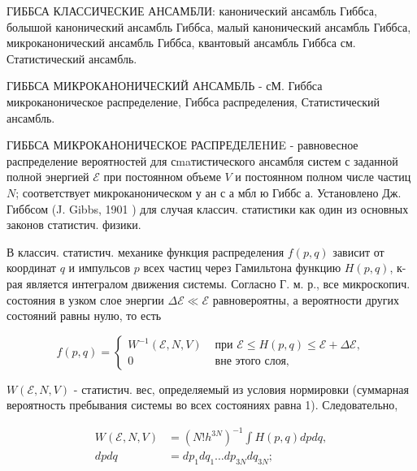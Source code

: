 \documentclass[10pt]{article}
\begin{document}
ГИББСА КЛАССИЧЕСКИЕ АНСАМБЛИ: канонический ансамбль Гиббса, болышой канонический ансамбль Гиббса, малый канонический ансамбль Гиббса, микроканонический ансамбль Гиббса, квантовый ансамбль Гиббса см. Статистический ансамбль.



ГИББСА МИКРОКАНОНИЧЕСКИЙ АНСАМБЛЬ - сМ. Гиббса микроканоническое распределение, Гиббса распределения, Статистический ансамбль.



ГИББСА МИКРОКАНОНИЧЕСКОЕ РАСПРЕДЕЛЕHИE - равновесное распределение вероятностей для сmaтистического ансамбля систем с заданной полной энергией $\mathscr{E}$ при постоянном объеме $V$ и постоянном полном числе частиц $N$; соответствует микроканоническом у ан с а мбл ю Гиббс а. Установлено Дж. Гиббсом (J. Gibbs, 1901 ) для случая классич. статистики как один из основных законов статистич. физики.



В классич. статистич. механике функция распределения $f(p, q)$ зависит от координат $q$ и импульсов $p$ всех частиц через Гамильтона функцию $H(p, q)$, к-рая является интегралом движения системы. Согласно Г. м. р., все микроскопич. состояния в узком слое энергии $\Delta \mathscr{E} \ll \mathscr{E}$ равновероятны, а вероятности других состояний равны нулю, то есть



\[

f(p, q)= \begin{cases}W^{-1}(\mathscr{E}, N, V) & \text { при } \mathscr{E} \leqslant H(p, q) \leqslant \mathscr{E}+\Delta \mathscr{E}, \\ 0 & \text { вне этого слоя, }\end{cases}

\]



$W(\mathscr{E}, N, V)$ - статистич. вес, определяемый из условия нормировки (суммарная вероятность пребывания системы во всех состояниях равна 1). Следовательно,



\[

\begin{aligned}

W(\mathscr{E}, N, V) & =\left(N ! h^{3 N}\right)^{-1} \int H(p, q) d p d q, \\

d p d q & =d p_{1} d q_{1} \ldots d p_{3 N} d q_{3 N} ;

\end{aligned}

\]
\end{document}
